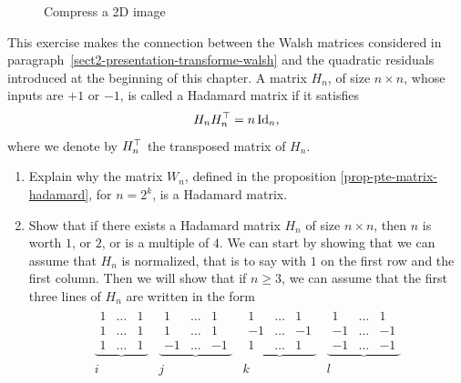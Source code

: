 \begin{exo}
\begin{enumerate}
\begin{figure}[ht]
\begin{center}
    \end{center}
    \caption{Compress a 2D image}
              \label{fig-compression-walsh-2d}
\end{figure}
\end{enumerate}
\end{exo}
 
 
\begin{exo}
\label{exo-matrices-hadamard}
   This exercise makes the connection between the Walsh matrices considered in paragraph~\ref{sect2-presentation-transforme-walsh} and the quadratic residuals introduced at the beginning of this chapter. A matrix $ H_n $, of size $ n \times n $, whose inputs are $ + 1 $ or $ -1 $, is called a Hadamard matrix if it satisfies
\begin{equation*}
H_n H_n^\top = n \operatorname{Id}_n,
\end{equation*}
where we denote by $ H_n^\top $ the transposed matrix of $ H_n $. \begin{enumerate}
\item Explain why the matrix $ W_n $, defined in the proposition \ref{prop-pte-matrix-hadamard}, for $ n = 2^k $, is a Hadamard matrix.
\item Show that if there exists a Hadamard matrix $ H_n $ of size $ n \times n $, then $ n $ is worth $ 1 $, or $ 2 $, or is a multiple of $ 4 $. We can start by showing that we can assume that $ H_n $ is normalized, that is to say with $ 1 $ on the first row and the first column. Then we will show that if $ n \geq 3 $, we can assume that the first three lines of $ H_n $ are written in the form
\begin{equation*}
\begin{array}{cccc} \underbrace{\begin{matrix} 1 & \ldots & 1 \\1 & \ldots & 1 \\1 & \ldots & 1 \end{matrix}} & \underbrace{\begin{matrix} 1 & \ldots & 1 \\1 & \ldots & 1 \\-1 & \ldots & -1 \end{matrix}} & \underbrace{\begin{matrix} 1 & \ldots & 1 \\-1 & \ldots & -1 \\1 & \ldots & 1 \end{matrix}} & \underbrace{\begin{matrix} 1 & \ldots & 1 \\-1 & \ldots & -1 \\- 1 & \ldots & -1 \end{matrix}} \\i & j & k & l \end{array}

\end{equation*}
\end{enumerate}
\end{exo}
